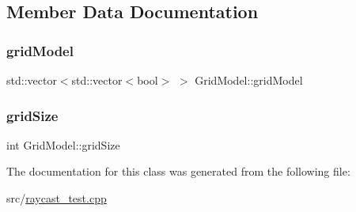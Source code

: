 \subsection{Member Data Documentation}
\mbox{\label{classGridModel_abb0600fef78c9377c63e9a34e77c164e}} 
\subsubsection{\texorpdfstring{grid\+Model}{gridModel}}
{\footnotesize\ttfamily std\+::vector$<$std\+::vector$<$bool$>$ $>$ Grid\+Model\+::grid\+Model}

\mbox{\label{classGridModel_ad9e4561ef965eaf3594c5738fe3e2bcf}} 
\subsubsection{\texorpdfstring{grid\+Size}{gridSize}}
{\footnotesize\ttfamily int Grid\+Model\+::grid\+Size}



The documentation for this class was generated from the following file\+:\begin{DoxyCompactItemize}
\item 
src/\hyperlink{raycast__test_8cpp}{raycast\+\_\+test.\+cpp}\end{DoxyCompactItemize}
